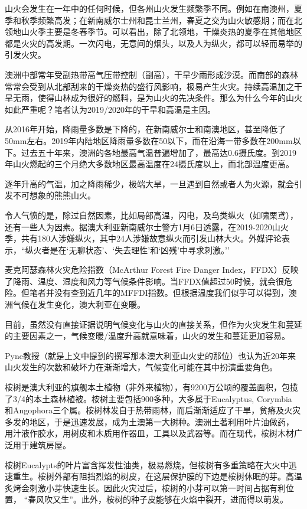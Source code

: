 \documentclass[]{book}
\begin{document}
山火会发生在一年中的任何时候，但各州山火发生频繁季不同。例如在南澳州，夏季和秋季频繁高发；在新南威尔士州和昆士兰州，春夏之交为山火敏感期；而在北领地山火季主要是冬春季节。可以看出，除了北领地，干燥炎热的夏季在其他地区都是火灾的高发期。一次闪电，无意间的烟头，以及人为纵火，都可以轻而易举的引发火灾。

澳洲中部常年受副热带高气压带控制（副高），干旱少雨形成沙漠。而南部的森林常常会受到从北部刮来的干燥炎热的盛行风影响，极易产生火灾。持续高温加之干旱无雨，使得山林成为很好的燃料，是为山火的先决条件。那么为什么今年的山火如此严重呢？笔者认为2019/2020年的干旱和高温是主因。

从2016年开始，降雨量多数是下降的，在新南威尔士和南澳地区，甚至降低了50mm左右。2019年内陆地区降雨量多数在50以下，而在沿海一带多数在200mm以下。过去五十年来，澳洲的各地最高气温普遍增加了，最高达0.6摄氏度。到2019年山火燃起的三个月绝大多数地区最高温度在24摄氏度以上，而北部温度更高。

逐年升高的气温，加之降雨稀少，极端大旱，一旦遇到自然或者人为火源，就会引发不可想象的熊熊山火。

令人气愤的是，除过自然因素，比如局部高温，闪电，及鸟类纵火（如啸栗鸢），还有一些人为因素。据澳大利亚新南威尔士警方1月6日透露，在2019-2020山火季，共有180人涉嫌纵火，其中24人涉嫌故意纵火而引发山林大火。外媒评论表示，``纵火者是在`无聊状态'、`失去理性'和`凶残'中寻求刺激。''

麦克阿瑟森林火灾危险指数（McArthur Forest Fire Danger Index，FFDX）反映了降雨、温度、湿度和风力等气候条件影响。当FFDX值超过50时候，就会很危险。但笔者并没有查到近几年的MFFDI指数。但根据温度我们似乎可以得到，澳洲气候在发生变化，澳大利亚在变暖。

目前，虽然没有直接证据说明气候变化与山火的直接关系，但作为火灾发生和蔓延的主要因素之一，气候变暖/温度升高就意味着，山火的发生和蔓延更加容易。

Pyne教授（就是上文中提到的撰写那本澳大利亚山火史的那位）也认为近20年来山火发生的次数和破坏力在渐渐增大，气候变化可能在其中扮演重要角色。

桉树是澳大利亚的旗舰本土植物（非外来植物），有9200万公顷的覆盖面积，包揽了3/4的本土森林植被。桉树主要包括900多种，大多属于Eucalyptus, Corymbia 和Angophora三个属。桉树林发自于热带雨林，而后渐渐适应了干旱，贫瘠及火灾多发的地区，于是迅速发展，成为土澳第一大树种。澳洲土著利用叶片油做药， 用汁液作胶水，用树皮和木质用作器皿，工具以及武器等。而在现代，桉树木材广泛用于建筑房屋。

桉树Eucalypts的叶片富含挥发性油类，极易燃烧，但桉树有多重策略在大火中迅速重生。桉树外部有阻挡烈焰的树皮，在这层保护膜的下边是桉树休眠的芽。高温炙烤会刺激小芽快速生长。因此火灾过后，桉树的小芽可以第一时间占据有利位置， ``春风吹又生''。此外，桉树的种子皮能够在火焰中裂开，进而得以萌发。
\end{document}
